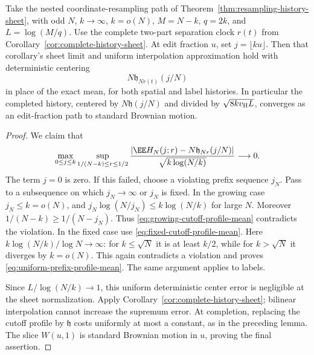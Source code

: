 \documentclass[11pt,letterpaper]{article}
\begin{document}
\begin{theorem}
\label{thm:profile-centered-history-sheet}
Take the nested coordinate-resampling path of
Theorem~\ref{thm:resampling-history-sheet}, with odd $N$,
$k\to\infty$, $k=o(N)$, $M=N-k$, $q=2k$, and
$L=\log(M/q)$.
Use the complete two-part separation clock $r(t)$ from
Corollary~\ref{cor:complete-history-sheet}.
At edit fraction $u$, set $j=\lfloor ku\rfloor$.
Then that corollary's sheet limit and uniform interpolation
approximation hold with deterministic centering
\begin{equation}\label{eq:profile-centered-history-sheet}
 N\mathfrak h_{N r(t)}(j/N)
\end{equation}
in place of the exact mean, for both spatial and label histories.
In particular the completed history, centered by
$N\mathfrak h(j/N)$ and divided by $\sqrt{8kv_{\rm H}L}$,
converges as an edit-fraction path to standard Brownian motion.
\end{theorem}
\begin{proof}
We claim that
\begin{equation}\label{eq:uniform-prefix-profile-mean}
 \max_{0\le j\le k}
 \sup_{1/(N-k)\le r\le1/2}
 \frac{|\EE H_N(j;r)-N\mathfrak h_{Nr}(j/N)|}
                              {\sqrt{k\log(N/k)}}\longrightarrow0.
\end{equation}
The term $j=0$ is zero.
If this failed, choose a violating prefix sequence $j_N$.
Pass to a subsequence on which $j_N\to\infty$ or
$j_N$ is fixed. In the growing case
$j_N\le k=o(N)$, and
$j_N\log(N/j_N)\le k\log(N/k)$ for large $N$.
Moreover $1/(N-k)\ge1/(N-j_N)$.
Thus \eqref{eq:growing-cutoff-profile-mean} contradicts
the violation.
In the fixed case use \eqref{eq:fixed-cutoff-profile-mean}.
Here $k\log(N/k)/\log N\to\infty$:
for $k\le\sqrt N$ it is at least $k/2$, while for
$k>\sqrt N$ it diverges by $k=o(N)$.
This again contradicts a violation and proves
\eqref{eq:uniform-prefix-profile-mean}.
The same argument applies to labels.

Since $L/\log(N/k)\to1$, this uniform deterministic
center error is negligible at the sheet normalization.
Apply Corollary~\ref{cor:complete-history-sheet};
bilinear interpolation cannot increase the supremum error.
At completion, replacing the cutoff profile by
$\mathfrak h$ costs uniformly at most a constant, as in
the preceding lemma. The slice $W(u,1)$ is standard
Brownian motion in $u$, proving the final assertion.
\end{proof}
\end{document}
